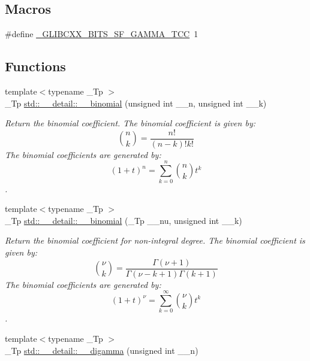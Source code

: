 \subsection*{Macros}
\begin{DoxyCompactItemize}
\item 
\#define \hyperlink{sf__gamma_8tcc_accc383e52e4dc6eebfd313a52961b49b}{\+\_\+\+G\+L\+I\+B\+C\+X\+X\+\_\+\+B\+I\+T\+S\+\_\+\+S\+F\+\_\+\+G\+A\+M\+M\+A\+\_\+\+T\+CC}~1
\end{DoxyCompactItemize}
\subsection*{Functions}
\begin{DoxyCompactItemize}
\item 
{\footnotesize template$<$typename \+\_\+\+Tp $>$ }\\\+\_\+\+Tp \hyperlink{namespacestd_1_1____detail_a4483574682ad034be17c75ef29892b02}{std\+::\+\_\+\+\_\+detail\+::\+\_\+\+\_\+binomial} (unsigned int \+\_\+\+\_\+n, unsigned int \+\_\+\+\_\+k)
\begin{DoxyCompactList}\small\item\em Return the binomial coefficient. The binomial coefficient is given by\+: \[ \binom{n}{k} = \frac{n!}{(n-k)! k!} \] The binomial coefficients are generated by\+: \[ \left(1 + t\right)^n = \sum_{k=0}^n \binom{n}{k} t^k \]. \end{DoxyCompactList}\item 
{\footnotesize template$<$typename \+\_\+\+Tp $>$ }\\\+\_\+\+Tp \hyperlink{namespacestd_1_1____detail_a9ac7d44eebfe3e1a3fb5ebbd9c08bd55}{std\+::\+\_\+\+\_\+detail\+::\+\_\+\+\_\+binomial} (\+\_\+\+Tp \+\_\+\+\_\+nu, unsigned int \+\_\+\+\_\+k)
\begin{DoxyCompactList}\small\item\em Return the binomial coefficient for non-\/integral degree. The binomial coefficient is given by\+: \[ \binom{\nu}{k} = \frac{\Gamma(\nu+1)}{\Gamma(\nu-k+1) \Gamma(k+1)} \] The binomial coefficients are generated by\+: \[ \left(1 + t\right)^\nu = \sum_{k=0}^\infty \binom{\nu}{k} t^k \]. \end{DoxyCompactList}\item 
{\footnotesize template$<$typename \+\_\+\+Tp $>$ }\\\+\_\+\+Tp \hyperlink{namespacestd_1_1____detail_a8ae60de1f8adf628c0b7f243231b98c3}{std\+::\+\_\+\+\_\+detail\+::\+\_\+\+\_\+digamma} (unsigned int \+\_\+\+\_\+n)

\end{DoxyCompactItemize}
